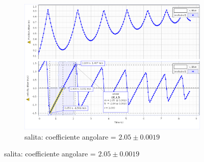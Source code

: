 \documentclass[a4paper]{article}
\theoremstyle{definition}
\begin{document}
\begin{figure}[!htbp]
{{			\begin{subfigure}{0.9\textwidth}
				\includegraphics[scale=0.45]{capstone_data/attrito2.png}
				\caption{salita: coefficiente angolare = \(2.05 \pm 0.0019\)}
			\end{subfigure}%
		}
	}
\end{figure}
\end{document}
